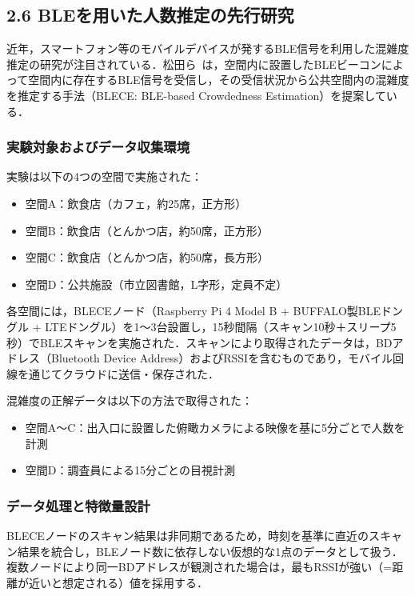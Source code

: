 \subsection*{2.6 BLEを用いた人数推定の先行研究}
近年，スマートフォン等のモバイルデバイスが発するBLE信号を利用した混雑度推定の研究が注目されている．松田ら~\cite{senkou}は，空間内に設置したBLEビーコンによって空間内に存在するBLE信号を受信し，その受信状況から公共空間内の混雑度を推定する手法（BLECE: BLE-based Crowdedness Estimation）を提案している．

\subsubsection*{実験対象およびデータ収集環境}

実験は以下の4つの空間で実施された：

\begin{itemize}
  \item 空間A：飲食店（カフェ，約25席，正方形）
  \item 空間B：飲食店（とんかつ店，約50席，正方形）
  \item 空間C：飲食店（とんかつ店，約50席，長方形）
  \item 空間D：公共施設（市立図書館，L字形，定員不定）
\end{itemize}

各空間には，BLECEノード（Raspberry Pi 4 Model B + BUFFALO製BLEドングル + LTEドングル）を1〜3台設置し，15秒間隔（スキャン10秒＋スリープ5秒）でBLEスキャンを実施された．スキャンにより取得されたデータは，BDアドレス（Bluetooth Device Address）およびRSSIを含むものであり，モバイル回線を通じてクラウドに送信・保存された．

混雑度の正解データは以下の方法で取得された：

\begin{itemize}
  \item 空間A〜C：出入口に設置した俯瞰カメラによる映像を基に5分ごとで人数を計測
  \item 空間D：調査員による15分ごとの目視計測
\end{itemize}

\subsubsection*{データ処理と特徴量設計}

BLECEノードのスキャン結果は非同期であるため，時刻を基準に直近のスキャン結果を統合し，BLEノード数に依存しない仮想的な1点のデータとして扱う．複数ノードにより同一BDアドレスが観測された場合は，最もRSSIが強い（=距離が近いと想定される）値を採用する．

